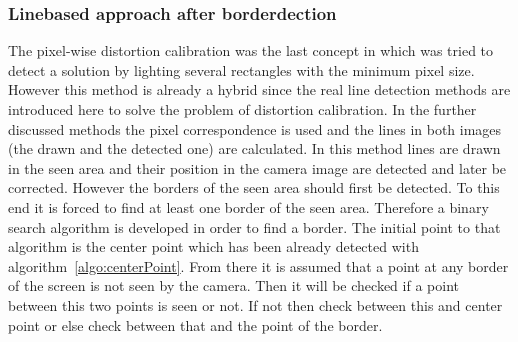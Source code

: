 \documentclass[journal,final,a4paper,twoside]{PS}
\begin{document}
\subsubsection{Linebased approach after borderdection}
\label{sec:boderDetect}
The pixel-wise distortion calibration was the last concept in which was tried to detect a solution by lighting several rectangles with the minimum pixel size. However this method is already a hybrid since the real line detection methods are introduced here to solve the problem of distortion calibration. In the further discussed methods the pixel correspondence is used and the lines in both images (the drawn and the detected one) are calculated. In this method lines are drawn in the seen area and their position in the camera image are detected and later be corrected. However the borders of the seen area should first be detected. To this end it is forced to find at least one border of the seen area. Therefore a binary search algorithm is developed in order to find a border. The initial point to that algorithm is the center point which has been already detected with algorithm~\ref{algo:centerPoint}. From there it is assumed that a point at any border of the screen is not seen by the camera. Then it will be checked if a point between this two points is seen or not. If not then check between this and center point or else check between that and the point of the border. %


\end{document}
